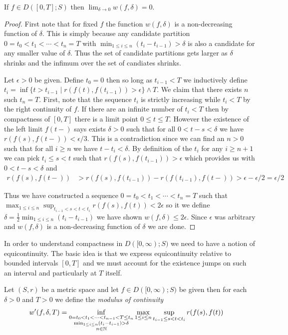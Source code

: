 \begin{lem}\label{SkorohodJ1ModulusOfContinuity}If $f \in D([0,T];S)$ then $\lim_{\delta \to 0} w(f,\delta)
  = 0$.
\end{lem}
\begin{proof}
First note that for fixed $f$ the function $w(f, \delta)$ is a
non-decreasing function of $\delta$.  This is simply because any
candidate partition $0 = t_0 < t_1 < \dotsb < t_n=T$ with $\min_{1
  \leq i \leq n} (t_i - t_{i-1}) > \delta$ is also a candidate for any
smaller value of $\delta$.  Thus the set of candidate partitions gets
larger as $\delta$ shrinks and the infimum over the set of candiates
shrinks.

Let $\epsilon > 0$ be given.  Define $t_0 = 0$ then so long as
$t_{i-1} < T$ we inductively define
$t_i = \inf \lbrace t > t_{i-1} \mid r(f(t), f(t_{i-1})) > \epsilon \rbrace \wedge T$.  We claim that
there exists $n$ such $t_n = T$.  First, note that the sequence $t_i$
is strictly increasing while $t_i < T$ by the right continuity of
$f$.  If there are an infinite number of $t_i < T$ then by compactness
of $[0,T]$ there is a limit point $0 \leq t \leq T$.  However the
existence of the left limit $f(t-)$ says
exists $\delta > 0$ such that for all $0 < t - s < \delta$ we have
$r(f(s), f(t-)) < \epsilon/3$.
This is a contradiction since we can find an $n > 0$ such that for all
$i \geq n$ we have $t - t_i < \delta$.  By definition of the
$t_i$ for any $i \geq n+1$ we can pick
$t_i \leq s < t$ such that $r(f(s), f(t_{i-1})) >
\epsilon$ which provides us with $0 < t -s < \delta$ and 
\begin{align*}
r(f(s),f(t-)) &> r(f(s), f(t_{i-1})) - r(f(t_{i-1}), f(t-)) > \epsilon -
\epsilon/2 = \epsilon/2
\end{align*}

Thus we have constructed a sequence $0 =t_0 < t_1 < \dotsb < t_n = T$
such that $\max_{1 \leq i \leq n} \sup_{t_{i-1} < s < t < t_i}
r(f(s),f(t)) < 2 \epsilon$ so it we define $\delta = \frac{1}{2} \min_{1 \leq i
  \leq n} (t_i - t_{i-1})$ we have shown $w(f, \delta) \leq 2
\epsilon$.  Since $\epsilon$ was arbitrary and $w(f,\delta)$ is a
non-decreasing function of $\delta$ we are done.
\end{proof}

In order to understand compactness in $D([0,\infty);S)$ we need to have a notion of equicontinuity.  The basic idea is that we
express equicontinuity relative to bounded intervals $[0,T]$ and we must account for the existence jumps on such an interval
and particularly at $T$ itself.
\begin{defn}Let $(S,r)$ be a metric space and let $f \in D([0,\infty); S)$ be given then for each $\delta > 0$ and $T > 0$ we define the \emph{modulus of continuity}
\begin{align*}
w^\prime(f,\delta, T) &= \inf_{\substack{0=t_0 < t_1 < \dotsb < t_{n-1} <  T \leq t_n \\
  \min_{1 \leq i \leq n} (t_i - t_{i-1}) > \delta \\ n \in \mathbb{N}}}
\max_{1 \leq i \leq n} \sup_{t_{i-1} \leq s < t < t_i} r(f(s), f(t))
\end{align*}
\end{defn}

